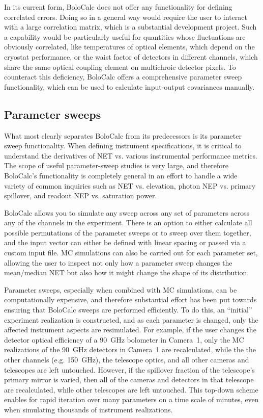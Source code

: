 In its current form, BoloCalc does not offer any functionality for defining correlated errors. Doing so in a general way would require the user to interact with a large correlation matrix, which is a substantial development project. Such a capability would be particularly useful for quantities whose fluctuations are obviously correlated, like temperatures of optical elements, which depend on the cryostat performance, or the waist factor of detectors in different channels, which share the same optical coupling element on multichroic detector pixels. To counteract this deficiency, BoloCalc offers a comprehensive parameter sweep functionality, which can be used to calculate input-output covariances manually.


\subsection{Parameter sweeps}
\label{sec:bolocalc_parameter_sweeps}

What most clearly separates BoloCalc from its predecessors is its parameter sweep functionality. When defining instrument specifications, it is critical to understand the derivatives of NET vs. various instrumental performance metrics. The scope of useful parameter-sweep studies is very large, and therefore BoloCalc's functionality is completely general in an effort to handle a wide variety of common inquiries such as NET vs. elevation, photon NEP vs. primary spillover, and readout NEP vs. saturation power.

BoloCalc allows you to simulate any sweep across any set of parameters across any of the channels in the experiment. There is an option to either calculate all possible permutations of the parameter sweeps or to sweep over them together, and the input vector can either be defined with linear spacing or passed via a custom input file. MC simulations can also be carried out for each parameter set, allowing the user to inspect not only how a parameter sweep changes the mean/median NET but also how it might change the shape of its distribution.

Parameter sweeps, especially when combined with MC simulations, can be computationally expensive, and therefore substantial effort has been put towards ensuring that BoloCalc sweeps are performed efficiently. To do this, an ``initial'' experiment realization is constructed, and as each parameter is changed, only the affected instrument aspects are resimulated. For example, if the user changes the detector optical efficiency of a 90~GHz bolometer in Camera~1, only the MC realizations of the 90~GHz detectors in Camera~1 are recalculated, while the the other channels (e.g. 150~GHz), the telescope optics, and all other cameras and telescopes are left untouched. However, if the spillover fraction of the telescope's primary mirror is varied, then all of the cameras and detectors in that telescope are recalculated, while other telescopes are left untouched. This top-down scheme enables for rapid iteration over many parameters on a time scale of minutes, even when simulating thousands of instrument realizations. 

